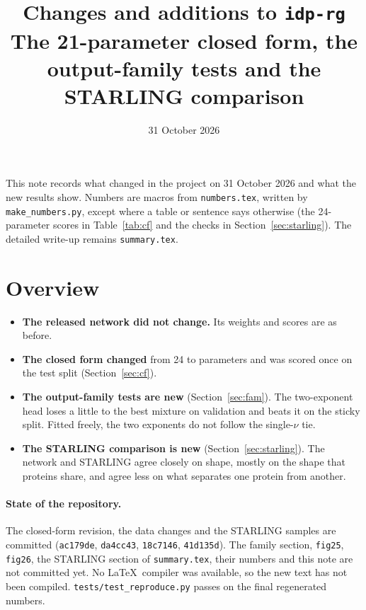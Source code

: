 \documentclass[11pt]{article}
\title{Changes and additions to \texttt{idp-rg}\\ \large The 21-parameter closed form, the output-family tests and the
STARLING comparison}
\date{31 October 2026}
\author{}
\begin{document}
\maketitle

\noindent This note records what changed in the project on 31 October 2026 and what the new results show. Numbers are macros from
\texttt{numbers.tex}, written by \texttt{make\_numbers.py}, except where a table or sentence says otherwise (the 24-parameter scores in Table~\ref{tab:cf} and the checks in Section~\ref{sec:starling}). The detailed write-up
remains \texttt{summary.tex}.

\tableofcontents

\section{Overview}
\begin{itemize}
\item \textbf{The released network did not change.} Its weights and scores are as before.
\item \textbf{The closed form changed} from 24 to  parameters and was scored once on the test split
  (Section~\ref{sec:cf}).
\item \textbf{The output-family tests are new} (Section~\ref{sec:fam}). The two-exponent head loses a little to the best
  mixture on validation and beats it on the sticky split. Fitted freely, the two exponents do not follow the single-$\nu$ tie.
\item \textbf{The STARLING comparison is new} (Section~\ref{sec:starling}). The network and STARLING agree closely on shape, mostly on
  the shape that proteins share, and agree less on what separates one protein from another.
\end{itemize}

\paragraph{State of the repository.} The closed-form revision, the data changes and the STARLING samples are committed
(\texttt{ac179de}, \texttt{da4cc43}, \texttt{18c7146}, \texttt{41d135d}). The family section, \texttt{fig25}, \texttt{fig26}, the STARLING section
of \texttt{summary.tex}, their numbers and this note are not committed yet. No \LaTeX\ compiler was available, so the new text has
not been compiled. \texttt{tests/test\_reproduce.py} passes on the final regenerated numbers.
\end{document}
